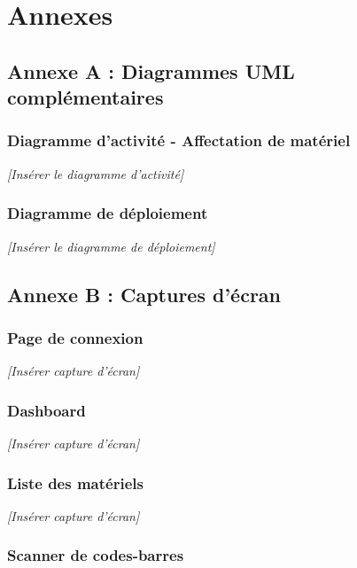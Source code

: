 \appendix

\chapter{Annexes}

\section{Annexe A : Diagrammes UML complémentaires}

\subsection{Diagramme d'activité - Affectation de matériel}

\textit{[Insérer le diagramme d'activité]}

\subsection{Diagramme de déploiement}

\textit{[Insérer le diagramme de déploiement]}

\section{Annexe B : Captures d'écran}

\subsection{Page de connexion}

\textit{[Insérer capture d'écran]}

\subsection{Dashboard}

\textit{[Insérer capture d'écran]}

\subsection{Liste des matériels}

\textit{[Insérer capture d'écran]}

\subsection{Scanner de codes-barres}

